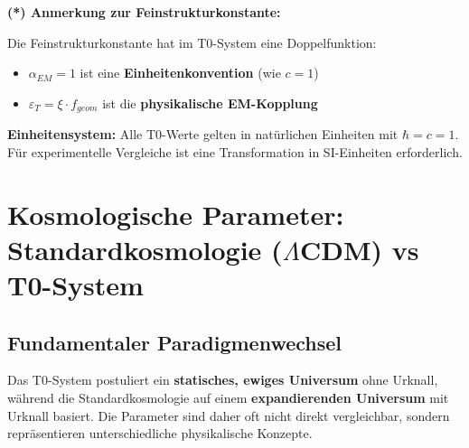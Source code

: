 \textbf{(*) Anmerkung zur Feinstrukturkonstante:}

Die Feinstrukturkonstante hat im T0-System eine Doppelfunktion:
\begin{itemize}
	\item $\alpha_{EM} = 1$ ist eine \textbf{Einheitenkonvention} (wie $c = 1$)
	\item $\varepsilon_T = \xi \cdot f_{geom}$ ist die \textbf{physikalische EM-Kopplung}
\end{itemize}

\textbf{Einheitensystem:}
Alle T0-Werte gelten in natürlichen Einheiten mit $\hbar = c = 1$. Für experimentelle Vergleiche ist eine Transformation in SI-Einheiten erforderlich.

\section{Kosmologische Parameter: Standardkosmologie ($\Lambda$CDM) vs T0-System}
\label{sec:cosmic_t0_mapping}

\subsection{Fundamentaler Paradigmenwechsel}
\label{subsec:paradigm_shift}

\begin{tcolorbox}[colback=red!5!white,colframe=red!75!black,title=Warnung: Fundamentale Unterschiede]
	Das T0-System postuliert ein \textbf{statisches, ewiges Universum} ohne Urknall, während die Standardkosmologie auf einem \textbf{expandierenden Universum} mit Urknall basiert. Die Parameter sind daher oft nicht direkt vergleichbar, sondern repräsentieren unterschiedliche physikalische Konzepte.
\end{tcolorbox}

